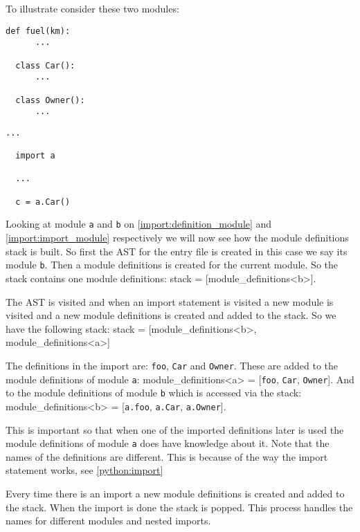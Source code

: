 To illustrate consider these two modules:

\begin{lstlisting}[style=python, caption={A module that defines a function and two classes called \texttt{a}}, label={import:definition_module}]
  def fuel(km):
      ...

  class Car():
      ...

  class Owner():
      ...
\end{lstlisting}
\begin{lstlisting}[style=python, caption={A module called \texttt{b} importing the above module \texttt{a}}, label={import:import_module}]
  ...
  
  import a
  
  ...

  c = a.Car()
\end{lstlisting}


Looking at module \texttt{a} and \texttt{b} on \cref{import:definition_module} and \cref{import:import_module} respectively we will now see how the module definitions stack is built.
So first the AST for the entry file is created in this case we say its module \texttt{b}.
Then a module definitions is created for the current module.
So the stack contains one module definitions: stack = [module\_definitions<b>].

The AST is visited and when an import statement is visited a new module is visited and a new module definitions is created and added to the stack.
So we have the following stack: stack = [module\_definitions<b>, module\_definitions<a>]

The definitions in the import are: \texttt{foo}, \texttt{Car} and \texttt{Owner}.
These are added to the module definitions of module \texttt{a}: module\_definitions<a> = [\texttt{foo}, \texttt{Car}, \texttt{Owner}].
And to the  module definitions of module \texttt{b} which is accessed via the stack:  module\_definitions<b> = [\texttt{a.foo}, \texttt{a.Car}, \texttt{a.Owner}].

This is important so that when one of the imported definitions later is used the module definitions of module \texttt{a} does have knowledge about it.
Note that the names of the definitions are different.
This is because of the way the import statement works, see \cref{python:import}

Every time there is an import a new module definitions is created and added to the stack.
When the import is done the stack is popped.
This process handles the names for different modules and nested imports.
